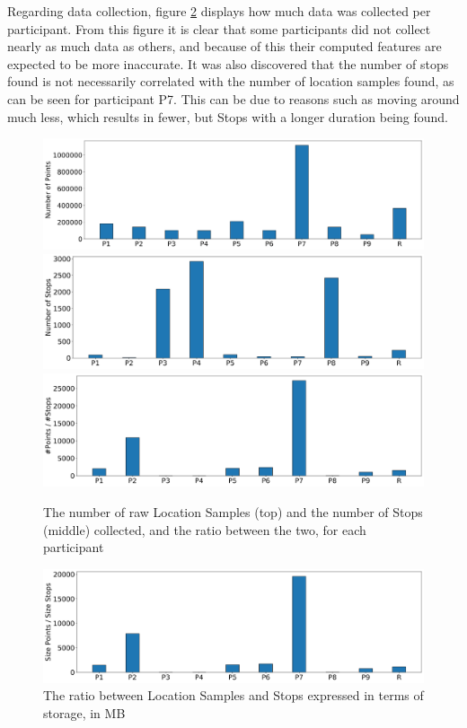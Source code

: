 Regarding data collection, figure \ref{fig:plot-num-points-stops} displays how much data was collected per participant. From this figure it is clear that some participants did not collect nearly as much data as others, and because of this their computed features are expected to be more inaccurate. It was also discovered that the number of stops found is not necessarily correlated with the number of location samples found, as can be seen for participant P7. This can be due to reasons such as moving around much less, which results in fewer, but Stops with a longer duration being found. 

\begin{figure}
    \centering
    \includegraphics[width=\textwidth]{images/study/storage/num_points.png}
    \includegraphics[width=\textwidth]{images/study/storage/num_stops.png}
    \includegraphics[width=\textwidth]{images/study/storage/compression_N.png}
    \caption{The number of raw Location Samples (top) and the number of Stops (middle) collected, and the ratio between the two, for each participant}
    \label{fig:plot-num-points-stops}
\end{figure}

\begin{figure}
    \centering
    \includegraphics[width=\textwidth]{images/study/storage/compression_mb.png}
    \caption{The ratio between Location Samples and Stops expressed in terms of storage, in MB}
    \label{fig:plot-num-points-stops}
\end{figure}

